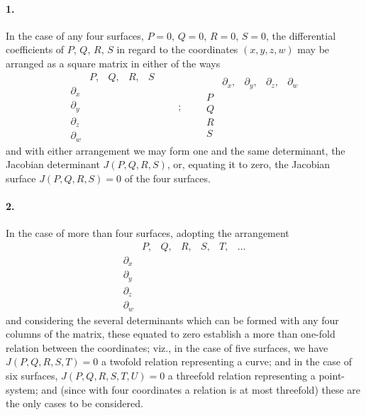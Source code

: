 \documentclass[11pt,a4paper]{article}
\begin{document}
\paragraph{1.}
In the case of any four surfaces, $P = 0$, $Q = 0$, $R = 0$, $S = 0$, the differential
coefficients of $P$, $Q$, $R$, $S$ in regard to the coordinates $(x, y, z, w)$ may be
arranged as a square matrix in either of the ways
\[
\begin{array}{c|cccc}
 & P, & Q, & R, & S \\\hline
\partial_x & & & & \\
\partial_y & & & & \\
\partial_z & & & & \\
\partial_w & & & &
\end{array}
\qquad ; \qquad
\begin{array}{c|cccc}
 & \partial_x, & \partial_y, & \partial_z, & \partial_w \\\hline
P & & & & \\
Q & & & & \\
R & & & & \\
S & & & &
\end{array}
\]
and with either arrangement we may form one and the same determinant, the Jacobian
determinant $J(P, Q, R, S)$, or, equating it to zero, the Jacobian surface
$J(P, Q, R, S) = 0$ of the four surfaces.

\paragraph{2.}
In the case of more than four surfaces, adopting the arrangement
\[
\begin{array}{c|cccccc}
 & P, & Q, & R, & S, & T, & \ldots \\\hline
\partial_x & & & & & & \\
\partial_y & & & & & & \\
\partial_z & & & & & & \\
\partial_w & & & & & &
\end{array}
\]
and considering the several determinants which can be formed with any four columns of the
matrix, these equated to zero establish a more than one-fold relation between the
coordinates; viz., in the case of five surfaces, we have $J(P, Q, R, S, T) = 0$ a twofold
relation representing a curve; and in the case of six surfaces, $J(P, Q, R, S, T, U) = 0$
a threefold relation representing a point-system; and (since with four coordinates a
relation is at most threefold) these are the only cases to be considered.
\end{document}

